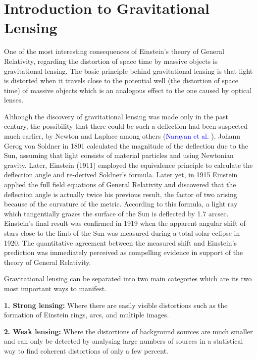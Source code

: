\chapter{Introduction to Gravitational Lensing}

One of the most interesting consequences of Einstein's theory of General Relativity, regarding the distortion of space time by massive objects is gravitational lensing. The basic principle behind gravitational lensing is that light is distorted when it travels close to the potential well (the distortion of space time) of massive objects which is an analogous effect to the one caused by optical lenses. 

Although the discovery of gravitational lensing was made only in the past century, the possibility that there could be such a deflection had been suspected much earlier, by Newton and Laplace among others (\textcolor{blue}{Narayan et al.} \citeyear{Reference25}). Johann Gerog von Soldner in 1801 calculated the magnitude of the deflection due to the Sun, assuming that light consists of material particles and using Newtonian gravity. Later, Einstein (1911) employed the equivalence principle to calculate the deflection angle and re-derived Soldner’s formula. Later yet, in 1915 Einstein applied the full field equations of General Relativity and discovered that the deflection angle is actually twice his previous result, the factor of two arising because of the curvature of the metric. According to this formula, a light ray which tangentially grazes the surface of the Sun is deflected by 1.7 arcsec. Einstein’s final result was confirmed in 1919 when the apparent angular shift of stars close to the limb of the Sun was measured during a total solar eclipse in 1920. The quantitative agreement between the measured shift and Einstein’s prediction was immediately perceived as compelling evidence in support of the theory of General Relativity.

Gravitational lensing can be separated into two main categories which are its two most important ways to manifest.

\textbf{1. Strong lensing:} Where there are easily visible distortions such as the formation of Einstein rings, arcs, and multiple images.

\textbf{2. Weak lensing:} Where the distortions of background sources are much smaller and can only be detected by analysing large numbers of sources in a statistical way to find coherent distortions of only a few percent.


